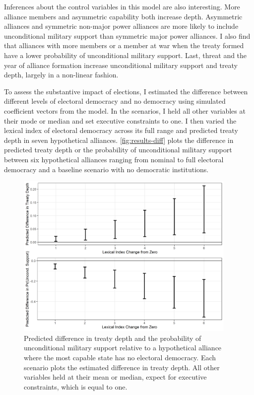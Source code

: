 \documentclass[12pt]{article}
\begin{document}
Inferences about the control variables in this model are also interesting.
More alliance members and asymmetric capability both increase depth. 
Asymmetric alliances and symmetric non-major power alliances are more likely to include unconditional military support than symmetric major power alliances. 
I also find that alliances with more members or a member at war when the treaty formed have a lower probability of unconditional military support. 
Last, threat and the year of alliance formation increase unconditional military support and treaty depth, largely in a non-linear fashion.


To assess the substantive impact of elections, I estimated the difference between different levels of electoral democracy and no democracy using simulated coefficient vectors from the model. 
In the scenarios, I held all other variables at their mode or median and set executive constraints to one. 
I then varied the lexical index of electoral democracy across its full range and predicted treaty depth in seven hypothetical alliances. 
\autoref{fig:results-diff} plots the difference in predicted treaty depth or the probability of unconditional military support between six hypothetical alliances ranging from nominal to full electoral democracy and a baseline scenario with no democratic institutions. 


\begin{figure}[hbtp]
\centering
\includegraphics[width=0.95\textwidth]{../figures/results-diff.png}
\caption{Predicted difference in treaty depth and the probability of unconditional military support relative to a hypothetical alliance where the most capable state has no electoral democracy. Each scenario plots the estimated difference in treaty depth. All other variables held at their mean or median, expect for executive constraints, which is equal to one.}
\label{fig:results-diff}
\end{figure}
\end{document}
